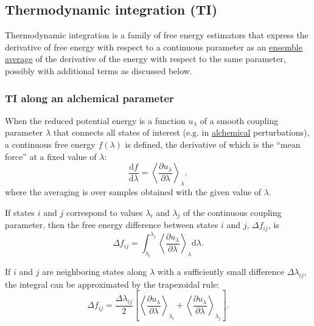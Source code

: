 \documentclass[9pt,review]{livecoms}
\begin{document}
\subsection{Thermodynamic integration (TI)}
\label{sec:fe_estimators:TI}

Thermodynamic integration is a family of free energy estimators that express the derivative of free energy with respect to a continuous parameter as an \hyperlink{ref:ensemble_average} {ensemble average} of the derivative of the energy with respect to the same parameter, possibly with additional terms as discussed below.

\subsubsection{TI along an alchemical parameter}

When the reduced potential energy is a function $u_\lambda$ of a smooth coupling parameter $\lambda$ that connects all states of interest (e.g. in \hyperlink{ref:Alchemical} {alchemical} perturbations), a continuous free energy $f(\lambda)$ is defined, the derivative of which is the ``mean force'' at a fixed value of $\lambda$:
\begin{equation}
\frac{\mathrm{d}f}{\mathrm{d}\lambda} =\left\langle \frac{\partial u_\lambda}{\partial \lambda} \right\rangle_\lambda,
\label{eq:TI1}
\end{equation}
where the averaging is over samples obtained with the given value of $\lambda$.

If states $i$ and $j$ correspond to values $\lambda_i$ and $\lambda_j$ of the continuous coupling parameter, then the free energy difference between states $i$ and $j$, $\Delta f_{ij}$, is
\begin{equation}
\Delta f_{ij} = \int_{\lambda_i}^{\lambda_j}  \left\langle \frac{\partial u_\lambda}{\partial \lambda} \right\rangle_\lambda \mathrm{d}\lambda.
\label{eq:TI2}
\end{equation}

If $i$ and $j$ are neighboring states along $\lambda$ with a sufficiently small difference $\Delta \lambda_{ij}$, the integral can be approximated by the trapezoidal rule:
\begin{equation}
\Delta f_{ij} = \frac{\Delta \lambda_{ij}}{2}\left[\left\langle \frac{\partial u_\lambda}{\partial \lambda} \right\rangle_{\lambda_i} + \left\langle \frac{\partial u_\lambda}{\partial \lambda} \right\rangle_{\lambda_j}\right].
\label{eq:TI}
\end{equation}
\end{document}
